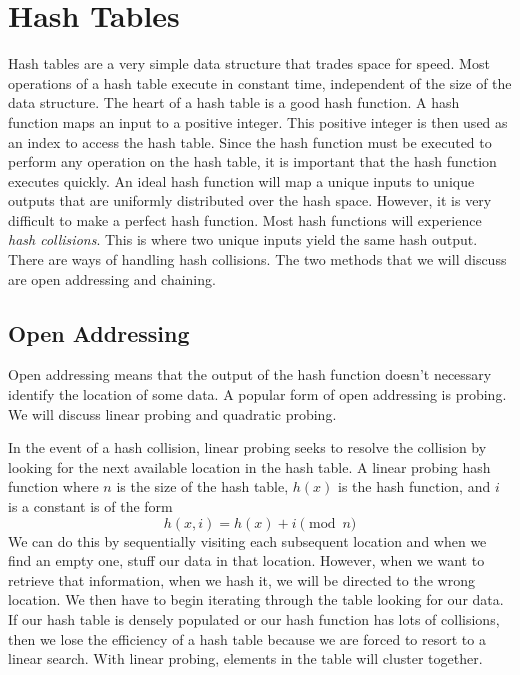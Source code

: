 \section*{Hash Tables}
Hash tables are a very simple data structure that trades space for speed.
Most operations of a hash table execute in constant time, independent of the size of the data structure.
The heart of a hash table is a good hash function.  A hash function maps an input to a positive integer.  This positive integer is then used as an index to access the hash table.  Since the hash function must be executed to perform any operation on the hash table, it is important that the hash function executes quickly.
An ideal hash function will map a unique inputs to unique outputs that are uniformly distributed over the hash space.  However, it is very difficult to make a perfect hash function.  Most hash functions will experience \emph{hash collisions}.  This is where two unique inputs yield the same hash output.
There are ways of handling hash collisions.  The two methods that we will discuss are open addressing and chaining.

\subsection*{Open Addressing}
Open addressing means that the output of the hash function doesn't necessary identify the location of some data.
A popular form of open addressing is probing. 
We will discuss linear probing and quadratic probing.

In the event of a hash collision, linear probing seeks to resolve the collision by looking for the next available location in the hash table.
A linear probing hash function where $n$ is the size of the hash table, $h(x)$ is the hash function, and $i$ is a constant is of the form
\begin{equation*}
h(x, i) = h(x) + i \pmod{n}
\end{equation*}
We can do this by sequentially visiting each subsequent location and when we find an empty one, stuff our data in that location.  
However, when we want to retrieve that information, when we hash it, we will be directed to the wrong location. 
We then have to begin iterating through the table looking for our data.
If our hash table is densely populated or our hash function has lots of collisions, then we lose the efficiency of a hash table because we are forced to resort to a linear search.
With linear probing, elements in the table will cluster together.

